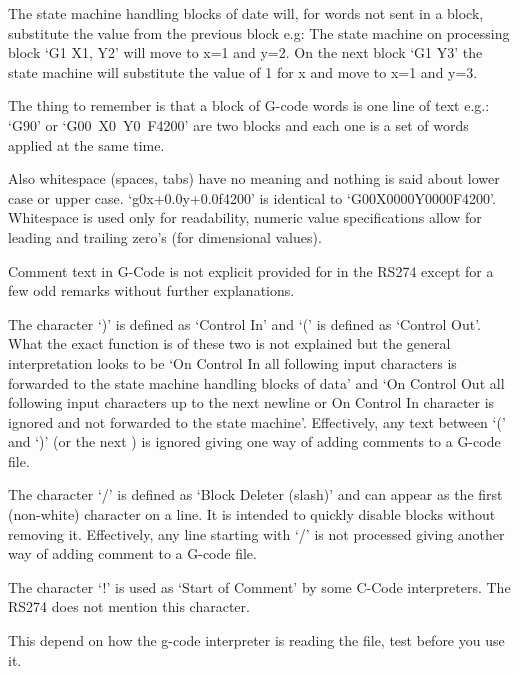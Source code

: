 The state machine handling blocks of date will, for words not sent in a block, substitute the value from the previous
block e.g: The state machine on processing block `G1 X1, Y2' will move to x=1 and y=2. On the next block `G1 Y3' the
state machine will substitute the value of 1 for x and move to x=1 and y=3.

The thing to remember is that a block of G-code words is one line of text e.g.: `G90\grammarnl' or
`G00~X0~Y0~F4200\grammarnl' are two blocks and each one is a set of words applied at the same time.

Also whitespace (spaces, tabs) have no meaning and nothing is said about lower case or upper case.
`g0\textvisiblespace{}x\textvisiblespace{}+0.0\textvisiblespace{}y\textvisiblespace{}+0.0\textvisiblespace{}f\textvisiblespace{}4200\grammarnl'
is identical to `G00X0000Y0000F4200\grammarnl'. Whitespace is used only for readability, numeric value specifications allow
for leading and trailing zero's (for dimensional values).

Comment text in G-Code is not explicit provided for in the RS274 except for a few odd remarks without
further explanations.

The character `)' is defined as `Control In' and
`(' is defined as
`Control Out'. What the exact function is of these two is not explained but the general interpretation looks to be
`On Control In all following input characters is forwarded to the state machine handling blocks of data' and
`On Control Out all following input characters up to the next newline or On Control In character is ignored and not
forwarded to the state machine'. Effectively, any text between `(' and `)' (or the next \grammarnl) is ignored giving one
way of adding comments to a G-code file.

The character `\slash' is defined as `Block Deleter (slash)' and
can appear as the first (non-white) character on a line. It is intended to quickly disable blocks without removing it. Effectively, any line starting with `\slash' is not processed giving another way of adding comment to a G-code file.

The character `!' is used as `Start of Comment' by some C-Code interpreters. The RS274 does not
mention this character.

This depend on how the g-code interpreter is reading the file, test before you use it.

